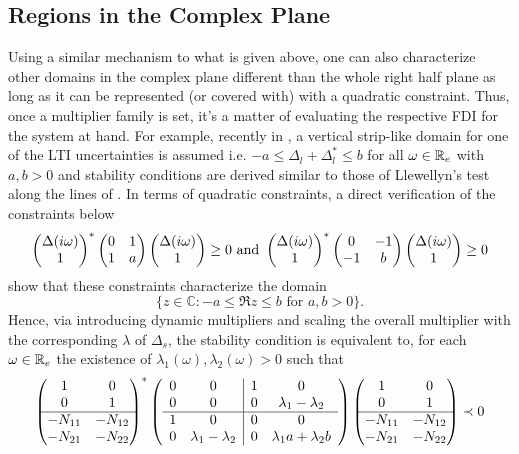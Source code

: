 \subsection{Regions in the Complex Plane}
Using a similar mechanism to what is given above, one can also characterize other domains in the complex 
plane different than the whole right half plane as long as it can be represented (or covered with) with a 
quadratic constraint. Thus, once a multiplier family is set, it's a matter of evaluating the respective FDI for the system
at hand. For example, recently in \cite{jazayeri}, a vertical strip-like domain for one of the LTI uncertainties is 
assumed i.e. $-a\leq \Delta_l + \Delta_l^* \leq b$ for all $\omega\in\mathbb{R}_e$ with $a,b>0$ 
and stability conditions are derived similar to those of Llewellyn's test along the lines of \cite{edsin}. In terms of quadratic 
constraints, a direct verification of the constraints below 
\[
\begin{pmatrix}\Delta(i\omega)\\ 1 \end{pmatrix}^*
\begin{pmatrix}0 &1\\1 &a\end{pmatrix}
\begin{pmatrix}\Delta(i\omega)\\ 1 \end{pmatrix} \geq 0 \text{ and }
\begin{pmatrix}\Delta(i\omega)\\ 1 \end{pmatrix}^*
\begin{pmatrix}0 &-1\\-1 &b\end{pmatrix}
\begin{pmatrix}\Delta(i\omega)\\ 1 \end{pmatrix} \geq 0
\]
show that these constraints characterize the domain 
\[
\{z\in\mathbb{C}: -a \leq \Re{z} \leq b \text{ for }a,b>0\}.
\]
Hence, via introducing dynamic multipliers and scaling the overall multiplier with the corresponding $\lambda$ of $\Delta_s$,
the stability condition is equivalent to, for each $\omega\in\mathbb{R}_e$ the existence of $\lambda_1(\omega),\lambda_2(\omega)>0$ 
such that
\begin{equation}
\begin{pmatrix}1 &0\\0 &1\\\hline-N_{11} &-N_{12}\\-N_{21} &-N_{22}\end{pmatrix}^*
\left(\begin{array}{cc|cc}
      0 &0                   &1 &0                  \\
      0 &0                   &0 &\lambda_1-\lambda_2\\ \hline
      1 &0                   &0 &0                  \\
      0 &\lambda_1-\lambda_2 &0 &\lambda_1 a+\lambda_2 b
\end{array}\right)
\begin{pmatrix}1 &0\\0 &1\\\hline-N_{11} &-N_{12}\\-N_{21} &-N_{22}\end{pmatrix} \prec 0
\label{eq:jazayeritest}
\end{equation}
